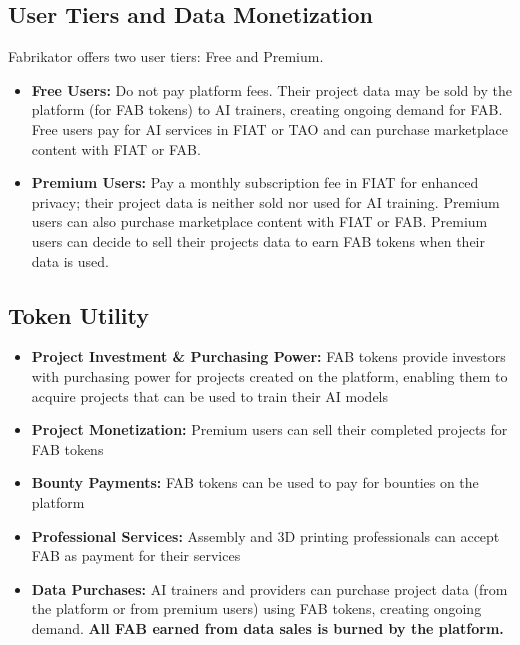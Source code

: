 
\subsection*{User Tiers and Data Monetization}

Fabrikator offers two user tiers: Free and Premium.

\begin{itemize}[leftmargin=*]
    \item \textbf{\textcolor{fabPrimary}{Free Users:}} Do not pay platform fees. Their project data may be sold by the platform (for FAB tokens) to AI trainers, creating ongoing demand for FAB. Free users pay for AI services in FIAT or TAO and can purchase marketplace content with FIAT or FAB.
    \item \textbf{\textcolor{fabSecondary}{Premium Users:}} Pay a monthly subscription fee in FIAT for enhanced privacy; their project data is neither sold nor used for AI training. Premium users can also purchase marketplace content with FIAT or FAB. Premium users can decide to sell their projects data to earn FAB tokens when their data is used.
\end{itemize}

\subsection*{Token Utility}
\begin{itemize}[leftmargin=*]
    \item \textbf{\textcolor{fabPrimary}{Project Investment \& Purchasing Power:}} FAB tokens provide investors with purchasing power for projects created on the platform, enabling them to acquire projects that can be used to train their AI models
    \item \textbf{\textcolor{fabPrimary}{Project Monetization:}} Premium users can sell their completed projects for FAB tokens
    \item \textbf{\textcolor{fabPrimary}{Bounty Payments:}} FAB tokens can be used to pay for bounties on the platform
    \item \textbf{\textcolor{fabPrimary}{Professional Services:}} Assembly and 3D printing professionals can accept FAB as payment for their services
    \item \textbf{\textcolor{fabPrimary}{Data Purchases:}} AI trainers and providers can purchase project data (from the platform or from premium users) using FAB tokens, creating ongoing demand. \textbf{All FAB earned from data sales is burned by the platform.}
\end{itemize}

